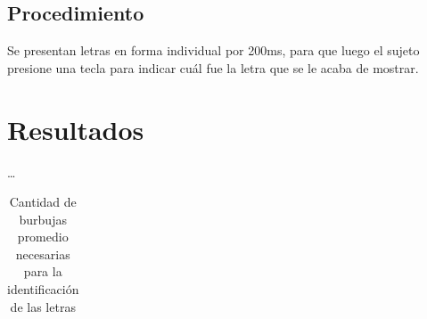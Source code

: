 \documentclass[runningheads,a4paper]{llncs}
\begin{document}
\subsection{Procedimiento}
Se presentan letras en forma individual por 200ms, para que luego el sujeto presione una tecla para indicar cuál fue la letra que se le acaba de mostrar.


\section{Resultados}
\ldots

\begin{table}
\centering
\label{tabla:cantidadBurbujas}
\caption{Cantidad de burbujas promedio necesarias para la identificación de las letras}
\begin{tabular}{c|r|r|r|c|r|r|r}


\end{tabular}
\end{table}
\end{document}
